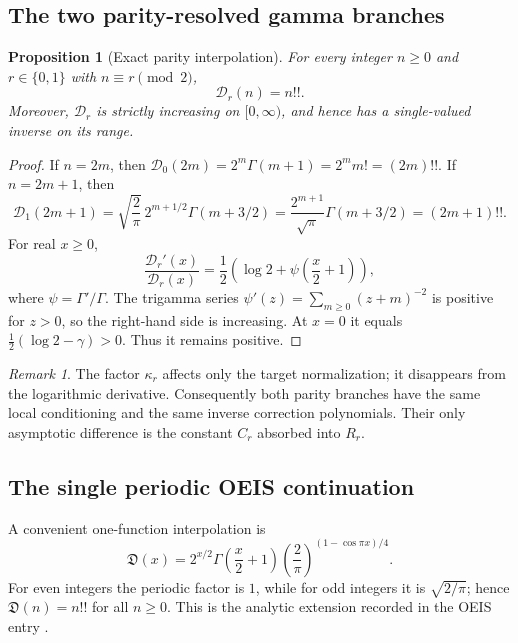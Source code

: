\documentclass[11pt,a4paper,oneside]{article}
\theoremstyle{plain}
\newtheorem{proposition}[theorem]{Proposition}
\theoremstyle{definition}
\theoremstyle{remark}
\newtheorem{remark}[theorem]{Remark}
\newcommand{\D}{\mathcal D}
\newcommand{\DO}{\mathfrak D}
\begin{document}
\subsection{The two parity-resolved gamma branches}

\begin{proposition}[Exact parity interpolation]
\label{prop:parity-interpolation}
For every integer $n\ge0$ and $r\in\{0,1\}$ with $n\equiv r\pmod2$,
\begin{equation}
 \D_r(n)=n!!.
 \label{eq:Dr-interpolation}
\end{equation}
Moreover, $\D_r$ is strictly increasing on $[0,\infty)$, and hence has a
single-valued inverse on its range.
\end{proposition}

\begin{proof}
If $n=2m$, then
$\D_0(2m)=2^m\Gamma(m+1)=2^m m!=(2m)!!$.  If $n=2m+1$, then
\[
 \D_1(2m+1)=\sqrt{\frac2\pi}\,2^{m+1/2}\Gamma(m+3/2)
 =\frac{2^{m+1}}{\sqrt\pi}\Gamma(m+3/2)=(2m+1)!!.
\]
For real $x\ge0$,
\begin{equation}
 \frac{\D_r'(x)}{\D_r(x)}
 =\frac12\left(\log2+\psi\!\left(\frac{x}{2}+1\right)\right),
 \label{eq:Dr-logder-exact}
\end{equation}
where $\psi=\Gamma'/\Gamma$.  The trigamma series
$\psi'(z)=\sum_{m\ge0}(z+m)^{-2}$ is positive for $z>0$, so the right-hand
side is increasing.  At $x=0$ it equals
$\tfrac12(\log2-\gamma)>0$.  Thus it remains positive.
\end{proof}

\begin{remark}
The factor $\kappa_r$ affects only the target normalization; it disappears
from the logarithmic derivative.  Consequently both parity branches have the
same local conditioning and the same inverse correction polynomials.  Their
only asymptotic difference is the constant $C_r$ absorbed into $R_r$.
\end{remark}

\subsection{The single periodic OEIS continuation}

A convenient one-function interpolation is
\begin{equation}
 \DO(x)=2^{x/2}\Gamma\!\left(\frac{x}{2}+1\right)
 \left(\frac2\pi\right)^{(1-\cos\pi x)/4}.
 \label{eq:OEIS-continuation}
\end{equation}
For even integers the periodic factor is $1$, while for odd integers it is
$\sqrt{2/\pi}$; hence $\DO(n)=n!!$ for all $n\ge0$.  This is the analytic
extension recorded in the OEIS entry \cite{OEIS}.
\end{document}
